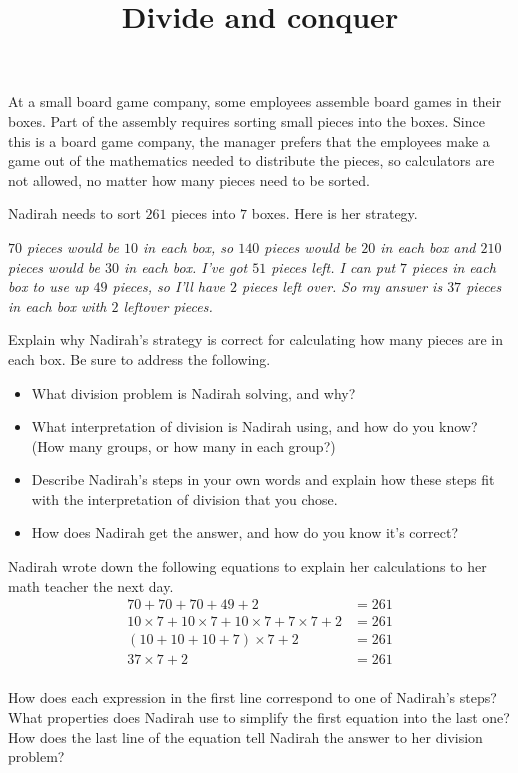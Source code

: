 \documentclass[nooutcomes,noauthor]{ximera}
\title{Divide and conquer}
\begin{document}
\begin{abstract}
\end{abstract}

\maketitle

At a small board game company, some employees assemble board games in their boxes. Part of the assembly requires sorting small pieces into the boxes. Since this is a board game company, the manager prefers that the employees make a game out of the mathematics needed to distribute the pieces, so calculators are not allowed, no matter how many pieces need to be sorted.

\begin{problem}
Nadirah needs to sort $261$ pieces into $7$ boxes. Here is her strategy. 

\emph{$70$ pieces would be $10$ in each box, so $140$ pieces would be $20$ in each box and $210$ pieces would be $30$ in each box. I've got $51$ pieces left. I can put $7$ pieces in each box to use up $49$ pieces, so I'll have $2$ pieces left over. So my answer is $37$ pieces in each box with $2$ leftover pieces.}

Explain why Nadirah's strategy is correct for calculating how many pieces are in each box. Be sure to address the following.
\begin{itemize}
	\item What division problem is Nadirah solving, and why?
	\item What interpretation of division is Nadirah using, and how do you know? (How many groups, or how many in each group?)
	\item Describe Nadirah's steps in your own words and explain how these steps fit with the interpretation of division that you chose.
	\item How does Nadirah get the answer, and how do you know it's correct?
\end{itemize}
\end{problem}


\begin{problem}
Nadirah wrote down the following equations to explain her calculations to her math teacher the next day.
\begin{align*}
70 + 70 + 70 + 49 + 2 &= 261 \\
10 \times 7 + 10 \times 7 + 10 \times 7 + 7 \times 7 + 2 &= 261 \\
(10 + 10 + 10 + 7) \times 7 + 2 &= 261 \\
37 \times 7 + 2 &= 261 \\
\end{align*}

How does each expression in the first line correspond to one of Nadirah's steps? What properties does Nadirah use to simplify the first equation into the last one? How does the last line of the equation tell Nadirah the answer to her division problem?


\end{problem}
\end{document}
